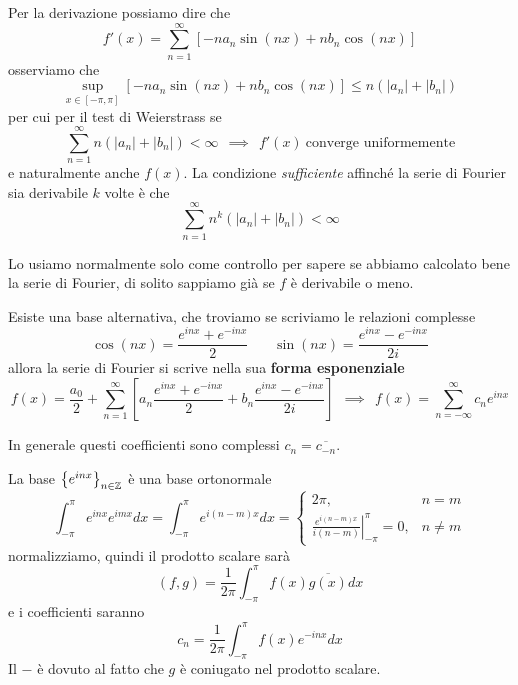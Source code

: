 \begin{thm}
[Derivazione]
Per la derivazione possiamo dire che
\begin{equation*}
f'(x) = \sum\limits^{\infty}_{n = 1}[ - na_{n}\sin(nx) + nb_{n}\cos(nx)]
\end{equation*}
osserviamo che
\begin{equation*}
\sup_{x\in [ - \pi, \pi]}[ - na_{n}\sin(nx) + nb_{n}\cos(nx)] \leq n(| a_{n}| + | b_{n}|)
\end{equation*}
per cui per il test di Weierstrass se
\begin{equation*}
\sum\limits^{\infty}_{n = 1} n(| a_{n}| + | b_{n}|) < \infty \ \ \implies \ \ f'(x) \ \text{converge uniformemente}
\end{equation*}
e naturalmente anche $f(x)$. La condizione \textit{sufficiente} affinché la serie di Fourier sia derivabile $k$ volte è che
\begin{equation*}
\sum\limits^{\infty}_{n = 1} n^{k}(| a_{n}| + | b_{n}|) < \infty
\end{equation*}
\end{thm}
\begin{rem}
Lo usiamo normalmente solo come controllo per sapere se abbiamo calcolato bene la serie di Fourier, di solito sappiamo già se $f$ è derivabile o meno.
\end{rem}
Esiste una base alternativa, che troviamo se scriviamo le relazioni complesse
\begin{equation*}
\cos(nx) = \frac{e^{inx} + e^{- inx}}{2} \ \ \ \ \ \ \ \ \sin(nx) = \frac{e^{inx} - e^{- inx}}{2i}
\end{equation*}
allora la serie di Fourier si scrive nella sua \textbf{forma esponenziale}
\begin{equation*}
f(x) = \frac{a_{0}}{2} + \sum\limits^{\infty}_{n = 1}\left[a_{n}\frac{e^{inx} + e^{- inx}}{2} + b_{n}\frac{e^{inx} - e^{- inx}}{2i}\right] \ \ \implies \ \ \boxed{f(x) = \sum\limits^{\infty}_{n = - \infty} c_{n} e^{inx}}
\end{equation*}
\begin{rem}
In generale questi coefficienti sono complessi $c_{n} = \overline{c_{- n}}$.
\end{rem}
\begin{rem}
La base $\left\{e^{inx}\right\}_{n\in \mathbb{Z}}$ è una base ortonormale
\begin{equation*}
\int^{\pi}_{- \pi} e^{inx} e^{imx} dx = \int^{\pi}_{- \pi} e^{i(n - m) x} dx =
\begin{cases}
2\pi, & n = m\\
\left. \frac{e^{i(n - m) x}}{i(n - m)}\right|^{\pi}_{- \pi} = 0, & n\neq m
\end{cases}
\end{equation*}
normalizziamo, quindi il prodotto scalare sarà
\begin{equation*}
(f, g) = \frac{1}{2\pi}\int^{\pi}_{- \pi} f(x)\overline{g(x)} dx
\end{equation*}
e i coefficienti saranno
\begin{equation*}
c_{n} = \frac{1}{2\pi}\int^{\pi}_{- \pi} f(x) e^{- inx} dx
\end{equation*}
Il $ - $ è dovuto al fatto che $g$ è coniugato nel prodotto scalare.
\end{rem}

